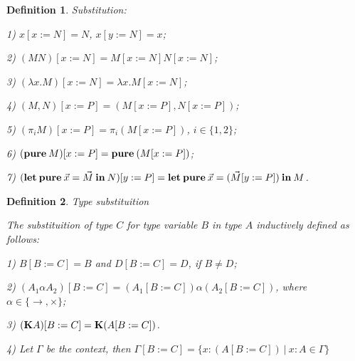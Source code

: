 \documentclass[a4paper]{article}
\newtheorem{defin}{Definition}
\begin{document}
  \begin{defin} Substitution:

  1) $x [x := N] = N$, $x [y := N] = x$;

  2) $(M N) [x := N] = M[x := N] N [x := N]$;

  3) $(\lambda x. M) [x := N] = \lambda x. M [x := N]$;

  4) $(M, N)[x := P] = (M[x := P], N [x := P])$;

  5) $(\pi_i M) [x := P] = \pi_i (M[x := P])$, $i \in \{ 1, 2\}$;

  6) $({\bf pure \: } M) [x := P] = {\bf pure \: } (M [x := P])$;

  7) $({\bf let \: pure \:}\vec{x} = \vec{M} {\: \bf in \:} N) [y := P] = {\bf let \: pure \:} \vec{x} = (\vec{M} [y := P]) {\: \bf in \:} M$.
  \end{defin}

  \begin{defin} Type substituition

    The substituition of type $C$ for type variable $B$ in type $A$ inductively defined as follows:

    1) $B [B := C] = B$ and $D [B := C] = D$, if $B \neq D$;

    2) $(A_1 \alpha A_2)[B := C] = (A_1[B := C]) \alpha (A_2[B := C])$, where $\alpha \in \{ \to, \times \}$;

    3) $({\bf K}A)[B := C] = {\bf K}(A [B := C])$.

    4) Let $\Gamma$ be the context, then $\Gamma [B := C] = \{ x : (A[B := C]) \: | \: x : A \in \Gamma \}$
  \end{defin}
\end{document}
